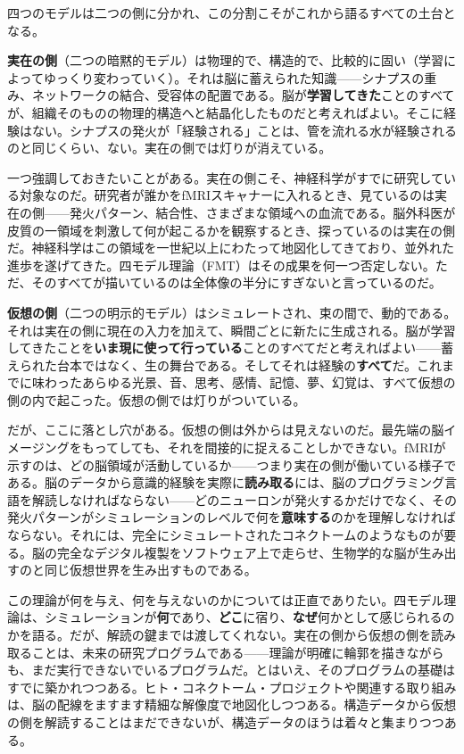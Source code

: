 \documentclass[11pt, twoside, openright]{book}
\begin{document}
四つのモデルは二つの側に分かれ、この分割こそがこれから語るすべての土台となる。

\textbf{実在の側}（二つの暗黙的モデル）は物理的で、構造的で、比較的に固い（学習によってゆっくり変わっていく）。それは脳に蓄えられた知識------シナプスの重み、ネットワークの結合、受容体の配置である。脳が\textbf{学習してきた}ことのすべてが、組織そのものの物理的構造へと結晶化したものだと考えればよい。そこに経験はない。シナプスの発火が「経験される」ことは、管を流れる水が経験されるのと同じくらい、ない。実在の側では灯りが消えている。

一つ強調しておきたいことがある。実在の側こそ、神経科学がすでに研究している対象なのだ。研究者が誰かをfMRIスキャナーに入れるとき、見ているのは実在の側------発火パターン、結合性、さまざまな領域への血流である。脳外科医が皮質の一領域を刺激して何が起こるかを観察するとき、探っているのは実在の側だ。神経科学はこの領域を一世紀以上にわたって地図化してきており、並外れた進歩を遂げてきた。四モデル理論（FMT）はその成果を何一つ否定しない。ただ、そのすべてが描いているのは全体像の半分にすぎないと言っているのだ。

\textbf{仮想の側}（二つの明示的モデル）はシミュレートされ、束の間で、動的である。それは実在の側に現在の入力を加えて、瞬間ごとに新たに生成される。脳が学習してきたことを\textbf{いま現に使って行っている}ことのすべてだと考えればよい------蓄えられた台本ではなく、生の舞台である。そしてそれは経験の\textbf{すべて}だ。これまでに味わったあらゆる光景、音、思考、感情、記憶、夢、幻覚は、すべて仮想の側の内で起こった。仮想の側では灯りがついている。

だが、ここに落とし穴がある。仮想の側は外からは見えないのだ。最先端の脳イメージングをもってしても、それを間接的に捉えることしかできない。fMRIが示すのは、どの脳領域が活動しているか------つまり実在の側が働いている様子である。脳のデータから意識的経験を実際に\textbf{読み取る}には、脳のプログラミング言語を解読しなければならない------どのニューロンが発火するかだけでなく、その発火パターンがシミュレーションのレベルで何を\textbf{意味する}のかを理解しなければならない。それには、完全にシミュレートされたコネクトームのようなものが要る。脳の完全なデジタル複製をソフトウェア上で走らせ、生物学的な脳が生み出すのと同じ仮想世界を生み出すものである。

この理論が何を与え、何を与えないのかについては正直でありたい。四モデル理論は、シミュレーションが\textbf{何}であり、\textbf{どこ}に宿り、\textbf{なぜ}何かとして感じられるのかを語る。だが、解読の鍵までは渡してくれない。実在の側から仮想の側を読み取ることは、未来の研究プログラムである------理論が明確に輪郭を描きながらも、まだ実行できないでいるプログラムだ。とはいえ、そのプログラムの基礎はすでに築かれつつある。ヒト・コネクトーム・プロジェクトや関連する取り組みは、脳の配線をますます精細な解像度で地図化しつつある。構造データから仮想の側を解読することはまだできないが、構造データのほうは着々と集まりつつある。
\end{document}
